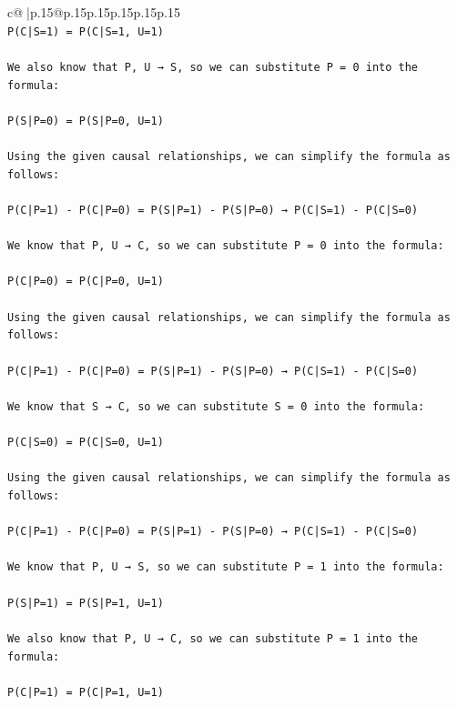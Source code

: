 \documentclass{article}
\begin{document}
{\begin{supertabular}{c@{$\;$}|p{.15\linewidth}@{}p{.15\linewidth}p{.15\linewidth}p{.15\linewidth}p{.15\linewidth}p{.15\linewidth}}
{{{\\ 
\texttt{P(C|S=1) = P(C|S=1, U=1)} \\
\\ 
\texttt{We also know that P, U → S, so we can substitute P = 0 into the formula:} \\
\\ 
\texttt{P(S|P=0) = P(S|P=0, U=1)} \\
\\ 
\texttt{Using the given causal relationships, we can simplify the formula as follows:} \\
\\ 
\texttt{P(C|P=1) {-} P(C|P=0) = P(S|P=1) {-} P(S|P=0) → P(C|S=1) {-} P(C|S=0)} \\
\\ 
\texttt{We know that P, U → C, so we can substitute P = 0 into the formula:} \\
\\ 
\texttt{P(C|P=0) = P(C|P=0, U=1)} \\
\\ 
\texttt{Using the given causal relationships, we can simplify the formula as follows:} \\
\\ 
\texttt{P(C|P=1) {-} P(C|P=0) = P(S|P=1) {-} P(S|P=0) → P(C|S=1) {-} P(C|S=0)} \\
\\ 
\texttt{We know that S → C, so we can substitute S = 0 into the formula:} \\
\\ 
\texttt{P(C|S=0) = P(C|S=0, U=1)} \\
\\ 
\texttt{Using the given causal relationships, we can simplify the formula as follows:} \\
\\ 
\texttt{P(C|P=1) {-} P(C|P=0) = P(S|P=1) {-} P(S|P=0) → P(C|S=1) {-} P(C|S=0)} \\
\\ 
\texttt{We know that P, U → S, so we can substitute P = 1 into the formula:} \\
\\ 
\texttt{P(S|P=1) = P(S|P=1, U=1)} \\
\\ 
\texttt{We also know that P, U → C, so we can substitute P = 1 into the formula:} \\
\\ 
\texttt{P(C|P=1) = P(C|P=1, U=1)} \\
\\ 
}}}
\end{supertabular}}
\end{document}
